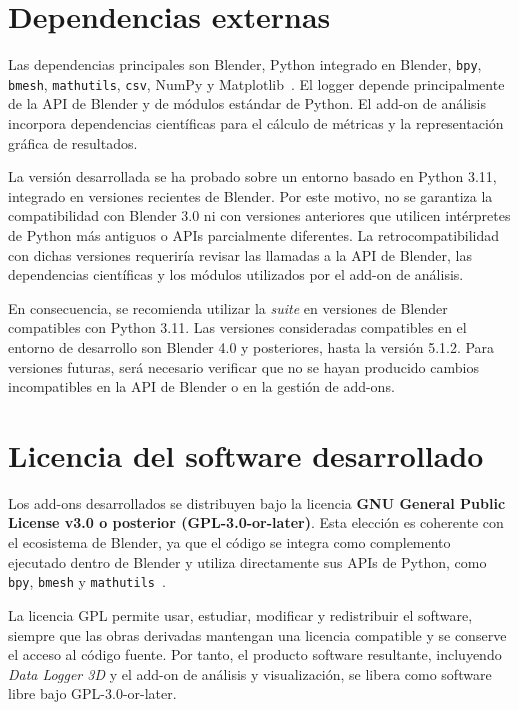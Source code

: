 \section{Dependencias externas}
\label{sec:d-dependencias}

Las dependencias principales son Blender, Python integrado en Blender, \texttt{bpy}, \texttt{bmesh}, \texttt{mathutils}, \texttt{csv}, NumPy y Matplotlib~\cite{blenderapi,pythonlang,numpy,matplotlib}. El logger depende principalmente de la API de Blender y de módulos estándar de Python. El add-on de análisis incorpora dependencias científicas para el cálculo de métricas y la representación gráfica de resultados.

La versión desarrollada se ha probado sobre un entorno basado en Python 3.11, integrado en versiones recientes de Blender. Por este motivo, no se garantiza la compatibilidad con Blender 3.0 ni con versiones anteriores que utilicen intérpretes de Python más antiguos o APIs parcialmente diferentes. La retrocompatibilidad con dichas versiones requeriría revisar las llamadas a la API de Blender, las dependencias científicas y los módulos utilizados por el add-on de análisis.

En consecuencia, se recomienda utilizar la \textit{suite} en versiones de Blender compatibles con Python 3.11. Las versiones consideradas compatibles en el entorno de desarrollo son Blender 4.0 y posteriores, hasta la versión 5.1.2. Para versiones futuras, será necesario verificar que no se hayan producido cambios incompatibles en la API de Blender o en la gestión de add-ons.


\section{Licencia del software desarrollado}
\label{sec:d-licencia-software}

Los add-ons desarrollados se distribuyen bajo la licencia \textbf{GNU General Public License v3.0 o posterior (GPL-3.0-or-later)}. Esta elección es coherente con el ecosistema de Blender, ya que el código se integra como complemento ejecutado dentro de Blender y utiliza directamente sus APIs de Python, como \texttt{bpy}, \texttt{bmesh} y \texttt{mathutils}~\cite{blenderapi,fsf_gpl3}.

La licencia GPL permite usar, estudiar, modificar y redistribuir el software, siempre que las obras derivadas mantengan una licencia compatible y se conserve el acceso al código fuente. Por tanto, el producto software resultante, incluyendo \textit{Data Logger 3D} y el add-on de análisis y visualización, se libera como software libre bajo GPL-3.0-or-later.

